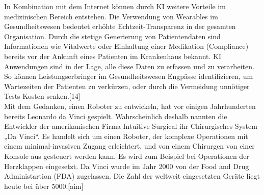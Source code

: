 In Kombination mit dem Internet können durch KI weitere Vorteile im medizinischen Bereich entstehen. Die Verwendung von Wearables im Gesundheitswesen bedeutet erhöhte Echtzeit-Transparenz in der gesamten Organisation. Durch die stetige Generierung von Patientendaten sind Informationen wie Vitalwerte oder Einhaltung einer Medikation (Compliance) bereits vor der Ankunft eines Patienten im Krankenhaus bekannt. KI Anwendungen sind in der Lage, alle diese Daten zu erfassen und zu verarbeiten. So können Leistungserbringer im Gesundheitswesen Engpässe identifizieren, um Wartezeiten der Patienten zu verkürzen, oder durch die Vermeidung unnötiger Tests Kosten senken.[14]\\

Mit dem Gedanken, einen Roboter zu entwickeln, hat vor einigen Jahrhunderten bereits Leonardo da Vinci gespielt. Wahrscheinlich deshalb nannten die Entwickler der amerikanischen Firma Intuitive Surgical ihr Chirurgisches System „Da Vinci“. Es handelt sich um einen Roboter, der komplexe Operationen mit einem minimal-invasiven Zugang erleichtert, und von einem Chirurgen von einer Konsole aus gesteuert werden kann. Es wird zum Beispiel bei Operationen der Herzklappen eingesetzt. 
Da Vinci wurde im Jahr 2000 von der Food and Drug Administartion (FDA) zugelassen. Die Zahl der weltweit eingesetzten Geräte liegt heute bei über 5000.[aim] 